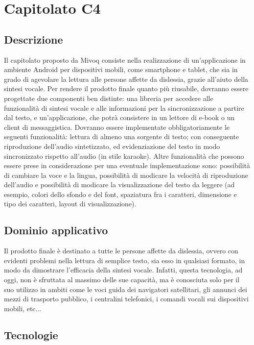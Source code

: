 \newpage
\section{Capitolato C4}

\subsection{Descrizione}

Il capitolato proposto da Mivoq consiste nella realizzazione di un'applicazione
in ambiente Android per dispositivi mobili, come smartphone e tablet,
che sia in grado di agevolare la lettura alle persone affette da dislessia,
grazie all'aiuto della sintesi vocale. Per rendere il prodotto finale
quanto più riusabile, dovranno essere progettate due componenti ben
distinte: una libreria per accedere alle funzionalità di sintesi vocale
e alle informazioni per la sincronizzazione a partire dal testo, e
un'applicazione, che potrà consistere in un lettore di e-book o un
client di messaggistica. Dovranno essere implementate obbligatoriamente
le seguenti funzionalità: lettura di almeno una sorgente di testo;
con conseguente riproduzione dell'audio sintetizzato, ed evidenziazione
del testo in modo sincronizzato rispetto all'audio (in stile karaoke).
Altre funzionalità che possono essere prese in considerazione per
una eventuale implementazione sono: possibilità di cambiare la voce
e la lingua, possibilità di modicare la velocità di riproduzione dell'audio
e possibilità di modicare la visualizzazione del testo da leggere
(ad esempio, colori dello sfondo e del font, spaziatura fra i caratteri,
dimensione e tipo dei caratteri, layout di visualizzazione).

\subsection{Dominio applicativo}

Il prodotto finale è destinato a tutte le persone affette da dislessia,
ovvero con evidenti problemi nella lettura di semplice testo, sia
esso in qualsiasi formato, in modo da dimostrare l'efficacia della
sintesi vocale. Infatti, questa tecnologia, ad oggi, non è sfruttata
al massimo delle sue capacità, ma è conosciuta solo per il suo utilizzo
in ambiti come le voci guida dei navigatori satellitari, gli annunci
dei mezzi di trasporto pubblico, i centralini telefonici, i comandi
vocali sui dispositivi mobili, etc...

\subsection{Tecnologie}


